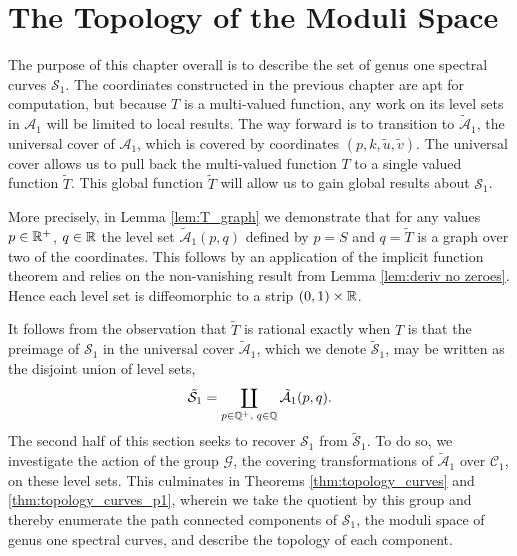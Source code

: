 \section{The Topology of the Moduli Space}
\label{sec:Topology}

The purpose of this chapter overall is to describe the set of genus one spectral curves $\mathcal{S}_1$. The coordinates constructed in the previous chapter are apt for computation, but because $T$ is a multi-valued function, any work on its level sets in $\mathcal{A}_1$ will be limited to local results. The way forward is to transition to $\mathcal{\tilde{A}}_1$, the universal cover of $\mathcal{A}_1$, which is covered by coordinates $(p,k,\tilde{u},\tilde{v})$. The universal cover allows us to pull back the multi-valued function $T$ to a single valued function $\tilde{T}$. This global function $\tilde{T}$ will allow us to gain global results about $\mathcal{S}_1$.

More precisely,
in Lemma \ref{lem:T_graph} we demonstrate that for any values $p \in \R^+$, $q\in\R$ the level set $\mathcal{\tilde{A}}_1(p,q)$ defined by $p = S$ and $q = \tilde{T}$ is a graph over two of the coordinates. This follows by an application of the implicit function theorem and relies on the non-vanishing result from Lemma \ref{lem:deriv no zeroes}. Hence each level set is diffeomorphic to a strip $(0,1)\times\R$.

It follows from the observation that $\tilde{T}$ is rational exactly when $T$ is that the preimage of $\mathcal{S}_1$ in the universal cover $\mathcal{\tilde{A}}_1$, which we denote $\mathcal{\tilde{S}}_1$, may be written as the disjoint union of level sets,
\[
\mathcal{\tilde{S}}_1 = \coprod_{p\in \Q^+,\; q\in \Q} \mathcal{\tilde{A}}_1(p,q).
\]
The second half of this section seeks to recover $\mathcal{S}_1$ from $\mathcal{\tilde{S}}_1$. To do so, we investigate the action of the group $\mathcal{G}$, the covering transformations of $\mathcal{\tilde{A}}_1$ over $\mathcal{C}_1$, on these level sets. This culminates in Theorems \ref{thm:topology_curves} and \ref{thm:topology_curves_p1}, wherein we take the quotient by this group and thereby enumerate the path connected components of $\mathcal{S}_1$, the moduli space of genus one spectral curves, and describe the topology of each component.




